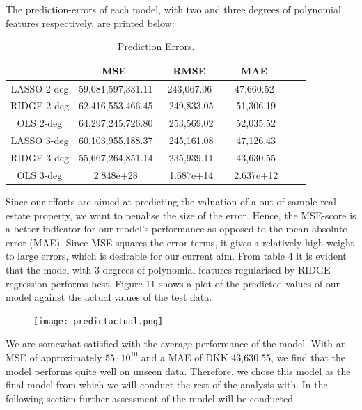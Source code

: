 \documentclass[12pt,a4paper]{article}
\begin{document}
The prediction-errors of each model, with two and three degrees of polynomial features respectively, are printed below:
\begin{table}[H]
\begin{center}
\caption{Prediction Errors. \label{time}}
\begin{tabular}{| c | c | c | c | c | c |} 
\hline
   & \ MSE \ & \, RMSE \ & \ MAE \ \\ \hline
   LASSO 2-deg & 59,081,597,331.11 & \ 243,067.06 \  & \ 47,660.52 \ \\ 
  RIDGE 2-deg & 62,416,553,466.45 & 249,833.05 & 51,306.19  \\ 
  OLS 2-deg & 64,297,245,726.80 & 253,569.02 & 52,035.52  \\ \hline 
  LASSO 3-deg & 60,103,955,188.37 & 245,161.08 & 47,126.43  \\ 
  RIDGE 3-deg & 55,667,264,851.14 & 235,939.11 & 43,630.55  \\ 
  OLS 3-deg & 2.848e+28 & 1.687e+14 & 2.637e+12  \\ \hline
\end{tabular}
\end{center}
\end{table}
Since our efforts are aimed at predicting the valuation of a out-of-sample real estate property, we want to penalise the size of the error. Hence, the MSE-score is a better indicator for our model's performance as opposed to the mean absolute error (MAE). Since MSE squares the error terms, it gives a relatively high weight to large errors, which is desirable for our current aim. \newline
From table 4 it is evident that the model with 3 degrees of polynomial features regularised by RIDGE regression performs best. Figure 11 shows a plot of the predicted values of our model against the actual values of the test data. 

\begin{figure}[H]
\centering
\caption{}
\texttt{[image: predictactual.png]}
\end{figure}
We are somewhat satisfied with the average performance of the model. With an MSE of approximately $55\cdot10^{10}$ and a MAE of DKK 43,630.55, we find that the model performs quite well on unseen data. Therefore, we chose this model as the final model from which we will conduct the rest of the analysis with. In the following section further assessment of the model will be conducted  \newline
\end{document}
